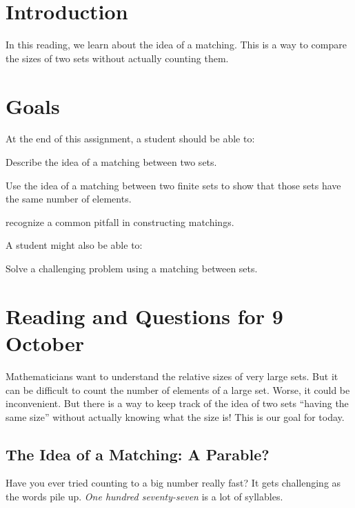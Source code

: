 \documentclass[12pt,letterpaper]{article}
\theoremstyle{definition}
\begin{document}
\setlength{\parskip}{1ex plus 0.5ex minus 0.2ex}
\setlength{\parindent}{0pt}

\pagestyle{fancy}
\cfoot{}

\section*{Introduction}
In this reading, we learn about the idea of a matching. 
This is a way to compare the sizes of two sets without actually counting them.

\section*{Goals}
At the end of this assignment, a student should be able to:
\begin{compactitem}
\item Describe the idea of a matching between two sets.
\item Use the idea of a matching between two finite sets to show that those sets have the same number of elements.
\item recognize a common pitfall in constructing matchings.
\end{compactitem}
A student might also be able to:
\begin{compactitem}
\item Solve a challenging problem using a matching between sets.
\end{compactitem}

\section*{Reading and Questions for 9 October}

Mathematicians want to understand the relative sizes of very large sets.
But it can be difficult to count the number of elements of a large set.
Worse, it could be inconvenient.
But there is a way to keep track of the idea of two sets ``having the same size'' without actually knowing what the size is!
This is our goal for today.

\subsection*{The Idea of a Matching: A Parable?}
Have you ever tried counting to a big number really fast?
It gets challenging as the words pile up. 
\emph{One hundred seventy-seven} is a lot of syllables.
\end{document}
